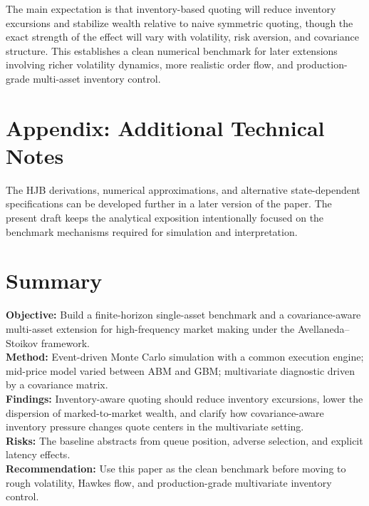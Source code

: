 \documentclass[a4paper,10pt,titlepage,oneside,openany]{book}
\theoremstyle{plain}\newtheorem{theorem}{Theorem}[chapter]
\theoremstyle{definition}\newtheorem{definition}{Definition}[chapter]
\theoremstyle{remark}\newtheorem{remark}{Remark}[chapter]
\newenvironment{summary}{%
  \clearpage
  \chapter*{Summary}%
  \addcontentsline{toc}{chapter}{Summary}%
  \markboth{Summary}{Summary}%
  \noindent\justifying
}{}
\begin{document}
The main expectation is that inventory-based quoting will reduce inventory excursions and stabilize wealth relative to naive symmetric quoting, though the exact strength of the effect will vary with volatility, risk aversion, and covariance structure. This establishes a clean numerical benchmark for later extensions involving richer volatility dynamics, more realistic order flow, and production-grade multi-asset inventory control.

\appendix
\chapter{Appendix: Additional Technical Notes}
The HJB derivations, numerical approximations, and alternative state-dependent specifications can be developed further in a later version of the paper. The present draft keeps the analytical exposition intentionally focused on the benchmark mechanisms required for simulation and interpretation.

\begin{summary}
\textbf{Objective:} Build a finite-horizon single-asset benchmark and a covariance-aware multi-asset extension for high-frequency market making under the Avellaneda--Stoikov framework.\\
\textbf{Method:} Event-driven Monte Carlo simulation with a common execution engine; mid-price model varied between ABM and GBM; multivariate diagnostic driven by a covariance matrix.\\
\textbf{Findings:} Inventory-aware quoting should reduce inventory excursions, lower the dispersion of marked-to-market wealth, and clarify how covariance-aware inventory pressure changes quote centers in the multivariate setting.\\
\textbf{Risks:} The baseline abstracts from queue position, adverse selection, and explicit latency effects.\\
\textbf{Recommendation:} Use this paper as the clean benchmark before moving to rough volatility, Hawkes flow, and production-grade multivariate inventory control.
\end{summary}
\end{document}
